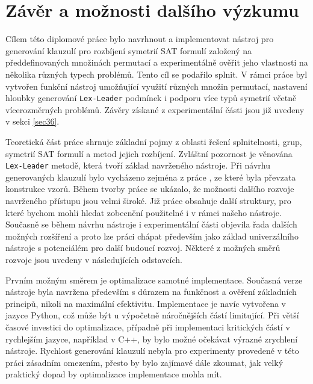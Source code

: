 \chapter*{Závěr a možnosti dalšího výzkumu}

Cílem této diplomové práce bylo navrhnout a implementovat nástroj pro generování klauzulí pro rozbíjení symetrií SAT formulí založený na předdefinovaných množinách permutací a experimentálně ověřit jeho vlastnosti na několika různých typech problémů. Tento cíl se podařilo splnit. V rámci práce byl vytvořen funkční nástroj umožňující využití různých množin permutací, nastavení hloubky generování \texttt{Lex-Leader} podmínek i podporu více typů symetrií včetně vícerozměrných problémů. Závěry získané z experimentální části jsou již uvedeny v sekci \ref{sec36}.

Teoretická část práce shrnuje základní pojmy z oblasti řešení splnitelnosti, grup, symetrií SAT formulí a metod jejich rozbíjení. Zvláštní pozornost je věnována \texttt{Lex-Leader} metodě, která tvoří základ navrženého nástroje. Při návrhu generovaných klauzulí bylo vycházeno zejména z práce \cite{codish2025breakingsymmetriessetcoveringperspective}, ze které byla převzata konstrukce vzorů. Během tvorby práce se ukázalo, že možnosti dalšího rozvoje navrženého přístupu jsou velmi široké. Již práce \cite{codish2025breakingsymmetriessetcoveringperspective} obsahuje další struktury, pro které bychom mohli hledat zobecnění použitelné i v rámci našeho nástroje. Současně se během návrhu nástroje i experimentální části objevila řada dalších možných rozšíření a proto lze práci chápat především jako základ univerzálního nástroje s potenciálém pro další budoucí rozvoj. Některé z možných směrů rozvoje jsou uvedeny v následujících odstavcích.

Prvním možným směrem je optimalizace samotné implementace. Současná verze nástroje byla navržena především s důrazem na funkčnost a ověření základních
principů, nikoli na maximální efektivitu. Implementace je navíc vytvořena v jazyce Python, což může být u výpočetně náročnějších částí limitující. Při větší časové
investici do optimalizace, případně při implementaci kritických částí v rychlejším jazyce, například v C++, by bylo možné očekávat výrazné zrychlení nástroje.
Rychlost generování klauzulí nebyla pro experimenty provedené v této práci zásadním omezením, přesto by bylo zajímavé dále zkoumat, jak velký praktický
dopad by optimalizace implementace mohla mít.

